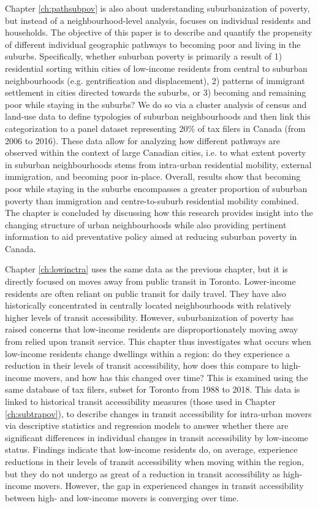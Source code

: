 Chapter \ref{ch:pathsubpov} is also about understanding suburbanization of poverty, but instead of a neighbourhood-level analysis, focuses on individual residents and households. The objective of this paper is to describe and quantify the propensity of different individual geographic pathways to becoming poor and living in the suburbs. Specifically, whether suburban poverty is primarily a result of 1) residential sorting within cities of low-income residents from central to suburban neighbourhoods (e.g. gentrification and displacement), 2) patterns of immigrant settlement in cities directed towards the suburbs, or 3) becoming and remaining poor while staying in the suburbs?  We do so via a cluster analysis of census and land-use data to define typologies of suburban neighbourhoods and then link this categorization to a panel dataset representing 20\% of tax filers in Canada (from 2006 to 2016). These data allow for analyzing how different pathways are observed within the context of large Canadian cities, i.e. to what extent poverty in suburban neighbourhoods stems from intra-urban residential mobility, external immigration, and becoming poor in-place. Overall, results show that becoming poor while staying in the suburbs encompasses a greater proportion of suburban poverty than immigration and centre-to-suburb residential mobility combined. The chapter is concluded by discussing how this research provides insight into the changing structure of urban neighbourhoods while also providing pertinent information to aid preventative policy aimed at reducing suburban poverty in Canada.

Chapter \ref{ch:lowinctra} uses the same data as the previous chapter, but it is directly focused on moves away from public transit in Toronto. Lower-income residents are often reliant on public transit for daily travel. They have also historically concentrated in centrally located neighbourhoods with relatively higher levels of transit accessibility. However, suburbanization of poverty has raised concerns that low-income residents are disproportionately moving away from relied upon transit service. This chapter thus investigates what occurs when low-income residents change dwellings within a region: do they experience a reduction in their levels of transit accessibility, how does this compare to high-income movers, and how has this changed over time? This is examined using the same database of tax filers, subset for Toronto from 1988 to 2018. This data is linked to historical transit accessibility measures (those used in Chapter \ref{ch:subtrapov}), to describe changes in transit accessibility for intra-urban movers via descriptive statistics and regression models to answer whether there are significant differences in individual changes in transit accessibility by low-income status. Findings indicate that low-income residents do, on average, experience reductions in their levels of transit accessibility when moving within the region, but they do not undergo as great of a reduction in transit accessibility as high-income movers. However, the gap in experienced changes in transit accessibility between high- and low-income movers is converging over time.

